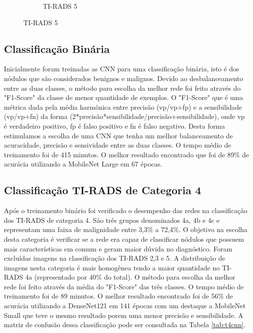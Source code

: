 \documentclass[12pt]{article}
\begin{document}
\begin{figure}[h]
\begin{subfigure}[t]{.3\textwidth}
  \caption{TI-RADS 5}
  \label{fig:t5s}
\end{subfigure}
\label{fig:tsquare}
\end{figure}

\subsection{Classificação Binária}

Inicialmente foram treinadas as CNN para uma classificação binária, isto é dos nódulos que são considerados benignos e malignos. Devido ao desbalanceamento entre as duas classes, o método para escolha da melhor rede foi feito através do "F1-Score" da classe de menor quantidade de exemplos. O "F1-Score" que é uma métrica dada pela média harmônica entre precisão (vp/vp+fp) e a sensibilidade (vp/vp+fn) da forma (2*precisão*sensibilidade/precisão+sensibilidade), onde vp é verdadeiro positivo, fp é falso positivo e fn é falso negativo. Desta forma estimulamos a escolha de uma CNN que tenha um melhor balanceamento de acuracidade, precisão e sensividade entre as duas classes. O tempo médio de treinamento foi de 415 minutos. O melhor resultado encontrado que foi de 89\% de acurácia utilizando a MobileNet Large em 67 épocas.

\subsection{Classificação TI-RADS de Categoria 4}
Após o treinamento binário foi verificado o desempenho das redes na classificação dos TI-RADS de categoria 4. São três grupos denominados 4a, 4b e 4c e representam uma faixa de malignidade entre 3,3\% a 72,4\%. O objetivo na escolha desta categoria é verificar se a rede era capaz de classificar nódulos que possuem mais características em comum e geram maior dúvida no diagnóstico. Foram excluídas imagens na classificação dos TI-RADS 2,3 e 5. A distribuição de imagens nesta categoria é mais homogênea tendo a maior quantidade no TI-RADS 4a (representado por 40\% do total). O método para escolha da melhor rede foi feito através da média do "F1-Score" das três classes. O tempo médio de treinamento foi de 89 minutos. O melhor resultado encontrado foi de 56\% de acurácia utilizando a DenseNet121 em 141 épocas com um destaque a MobileNet Small que teve o mesmo resultado porem uma menor precisão e sensibilidade. A matriz de confusão dessa classificação pode ser consultada na Tabela \ref{tab:t4cnn}.
\end{document}
